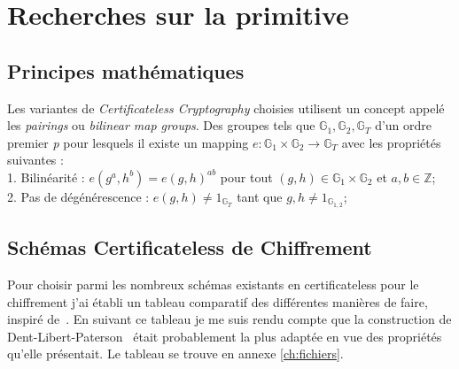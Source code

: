 \section{Recherches sur la primitive}
\subsection{Principes mathématiques}
Les variantes de \textit{Certificateless Cryptography} choisies utilisent un concept appelé les \textit{pairings} ou \textit{bilinear map groups}.
Des groupes tels que $\mathbb{G}_1, \mathbb{G}_2, \mathbb{G}_T$ d'un ordre premier \textit{p} pour lesquels il existe un mapping $e : \mathbb{G}_1 \times \mathbb{G}_2 \rightarrow \mathbb{G}_T$ avec les propriétés suivantes :\\
1. Bilinéarité : $e(g^a, h^b) = e(g, h)^{ab}$ pour tout $(g,h) \in \mathbb{G}_1 \times \mathbb{G}_2$ et $a,b \in \mathbb{Z}$;\\
2. Pas de dégénérescence : $e(g,h) \neq 1_{\mathbb{G}_T} $ tant que $g,h \neq 1_{\mathbb{G}_{1,2}}$;\\
\subsection{Schémas Certificateless de Chiffrement}
Pour choisir parmi les nombreux schémas existants en certificateless pour le chiffrement j'ai établi un tableau comparatif des différentes manières de faire, inspiré de~\cite{bookIntroCertificateless}. En suivant ce tableau je me suis rendu compte que la construction de Dent-Libert-Paterson~\cite{DBLP:conf/pkc/DentLP08} était probablement la plus adaptée en vue des propriétés qu'elle présentait. Le tableau se trouve en annexe \ref{ch:fichiers}.

